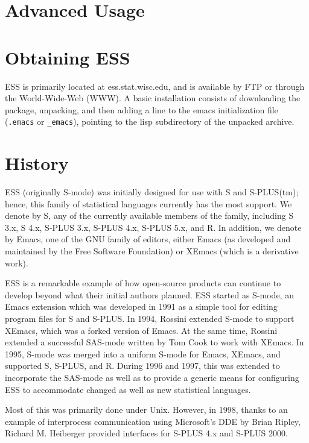 \documentclass{article}
\begin{document}
\section{Advanced Usage}
\label{sec:advanced}

\section{Obtaining ESS}
\label{sec:getIt}

ESS is primarily located at ess.stat.wisc.edu, and is available by FTP
or through the World-Wide-Web (WWW).  A basic installation consists of
downloading the package, unpacking, and then adding a line to the
emacs initialization file (\verb+.emacs+ or \verb+_emacs+), pointing
to the lisp subdirectory of the unpacked archive.

\section{History}
\label{sec:history}

ESS (originally S-mode) was initially designed for use with S and
S-PLUS(tm); hence, this family of statistical languages currently has
the most support.  We denote by S, any of the currently available
members of the family, including S 3.x, S 4.x, S-PLUS 3.x, S-PLUS 4.x,
S-PLUS 5.x, and R.  In addition, we denote by Emacs, one of the GNU
family of editors, either Emacs (as developed and maintained by the
Free Software Foundation) or XEmacs (which is a derivative work).

ESS is a remarkable example of how open-source products can continue
to develop beyond what their initial authors planned.  ESS started as
S-mode, an Emacs extension which was developed in 1991 as a simple
tool for editing program files for S and S-PLUS.  In 1994, Rossini
extended S-mode to support XEmacs, which was a forked version of
Emacs.  At the same time, Rossini extended a successful SAS-mode
written by Tom Cook to work with XEmacs.  In 1995, S-mode was merged
into a uniform S-mode for Emacs, XEmacs, and supported S, S-PLUS, and
R.  During 1996 and 1997, this was extended to incorporate the
SAS-mode as well as to provide a generic means for configuring ESS to
accommodate changed as well as new statistical languages.

Most of this was primarily done under Unix.  However, in 1998, thanks
to an example of interprocess communication using Microsoft's DDE by
Brian Ripley, Richard M. Heiberger provided interfaces for S-PLUS 4.x
and S-PLUS 2000.
\end{document}
